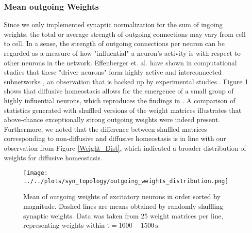 \documentclass[10pt,a4paper]{article}
\begin{document}
\subsubsection{Mean outgoing Weights}
Since we only implemented synaptic normalization for the sum of ingoing weights, the total or average strength of outgoing connections may vary from cell to cell. In a sense, the strength of outgoing connections per neuron can be regarded as a measure of how "influential" a neuron's activity is with respect to other neurons in the network. Effenberger et. al. have shown in computational studies that these "driver neurons" form highly active and interconnected subnetworks \cite{Effenberger_2015}, an observation that is backed up by experimental studies \cite{Yassin_Subnetworks_2010,Eckmann_Leader_Neurons_2008}. Figure \ref{Out_Weight_Mean_Quantile} shows that diffusive homeostasis allows for the emergence of a small group of highly influential neurons, which reproduces the findings in \cite{Effenberger_2015}. A comparison of statistics generated with shuffled versions of the weight matrices illustrates that above-chance exceptionally strong outgoing weights were indeed present. Furthermore, we noted that the difference between shuffled matrices corresponding to non-diffusive and diffusive homeostasis is in line with our observation from Figure \ref{Weight_Dist}, which indicated a broader distribution of weights for diffusive homeostasis.
\begin{figure}
\texttt{[image: ../../plots/syn\_topology/outgoing\_weights\_distribution.png]}
\caption{Mean of outgoing weights of excitatory neurons in order sorted by magnitude. Dashed lines are means obtained by randomly shuffling synaptic weights. Data was taken from 25 weight matrices per line, representing weights within $\mathrm{t=1000-1500\,s}$.}
\label{Out_Weight_Mean_Quantile}
\end{figure}
\end{document}

